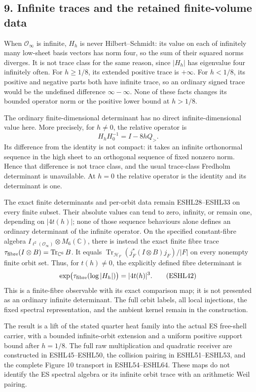 \documentclass[
  10pt,
  a4paper,
]{article}
\newcounter{none} %
\begin{document}
\subsection{9. Infinite traces and the retained finite-volume
data}\label{infinite-traces-and-the-retained-finite-volume-data}

When \(\mathcal O_\infty\) is infinite, \(H_h\) is never
Hilbert--Schmidt: its value on each of infinitely many low-sheet basis
vectors has norm four, so the sum of their squared norms diverges. It is
not trace class for the same reason, since \(|H_h|\) has eigenvalue four
infinitely often. For \(h\ge1/8\), its extended positive trace is
\(+\infty\). For \(h<1/8\), its positive and negative parts both have
infinite trace, so an ordinary signed trace would be the undefined
difference \(\infty-\infty\). None of these facts changes its bounded
operator norm or the positive lower bound at \(h>1/8\).

The ordinary finite-dimensional determinant has no direct
infinite-dimensional value here. More precisely, for \(h\ne0\), the
relative operator is \[
H_hH_0^{-1}=I-8hQ_>.
\tag{ESHL41}
\] Its difference from the identity is not compact: it takes an infinite
orthonormal sequence in the high sheet to an orthogonal sequence of
fixed nonzero norm. Hence that difference is not trace class, and the
usual trace-class Fredholm determinant is unavailable. At \(h=0\) the
relative operator is the identity and its determinant is one.

The exact finite determinants and per-orbit data remain ESHL28--ESHL33
on every finite subset. Their absolute values can tend to zero,
infinity, or remain one, depending on \(|4t(h)|\); none of those
sequence behaviours alone defines an ordinary determinant of the
infinite operator. On the specified constant-fibre algebra
\(I_{\ell^2(\mathcal O_\infty)}\otimes M_6(\mathbb C)\), there is
instead the exact finite fibre trace
\(\tau_{\rm fibre}(I\otimes B)=\operatorname{Tr}_{\mathbb C^6}B\). It
equals \(\operatorname{Tr}_{\mathcal H_F}(j_F^*(I\otimes B)j_F)/|F|\) on
every nonempty finite orbit set. Thus, for \(t(h)\ne0\), the explicitly
defined fibre determinant is \[
\exp\bigl(\tau_{\rm fibre}(\log|H_h|)\bigr)=|4t(h)|^3.
\tag{ESHL42}
\] This is a finite-fibre observable with its exact comparison map; it
is not presented as an ordinary infinite determinant. The full orbit
labels, all local injections, the fixed spectral representation, and the
ambient kernel remain in the construction.

The result is a lift of the stated quarter heat family into the actual
ES free-shell carrier, with a bounded infinite-orbit extension and a
uniform positive support bound after \(h=1/8\). The full raw
multiplication and quadratic receiver are constructed in ESHL45--ESHL50,
the collision pairing in ESHL51--ESHL53, and the complete Figure 10
transport in ESHL54--ESHL64. These maps do not identify the ES spectral
algebra or its infinite orbit trace with an arithmetic Weil pairing.
\end{document}
